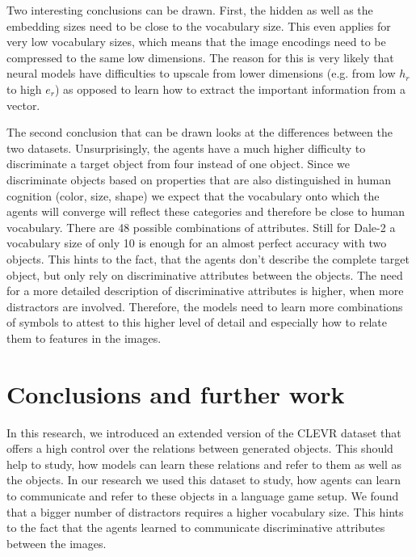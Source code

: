 \documentclass[11pt]{article}
\begin{document}
Two interesting conclusions can be drawn.
First, the hidden as well as the embedding sizes need to be close to the vocabulary size.
This even applies for very low vocabulary sizes, which means that the image encodings need to be compressed to the same low dimensions.
The reason for this is very likely that neural models have difficulties to upscale from lower dimensions (e.g. from low $h_r$ to high $e_r$) as opposed to learn how to extract the important information from a vector.

The second conclusion that can be drawn looks at the differences between the two datasets.
Unsurprisingly, the agents have a much higher difficulty to discriminate a target object from four instead of one object.
Since we discriminate objects based on properties that are also distinguished in human cognition (color, size, shape) we expect that the vocabulary onto which the agents will converge will reflect these categories and therefore be close to human vocabulary.
There are 48 possible combinations of attributes.
Still for Dale-2 a vocabulary size of only 10 is enough for an almost perfect accuracy with two objects.
This hints to the fact, that the agents don't describe the complete target object, but only rely on discriminative attributes between the objects.
The need for a more detailed description of discriminative attributes is higher, when more distractors are involved.
Therefore, the models need to learn more combinations of symbols to attest to this higher level of detail and especially how to relate them to features in the images.

\section{Conclusions and further work}
In this research, we introduced an extended version of the CLEVR dataset that offers a high control over the relations between generated objects.
This should help to study, how models can learn these relations and refer to them as well as the objects.
In our research we used this dataset to study, how agents can learn to communicate and refer to these objects in a language game setup.
We found that a bigger number of distractors requires a higher vocabulary size.
This hints to the fact that the agents learned to communicate discriminative attributes between the images.
\end{document}
